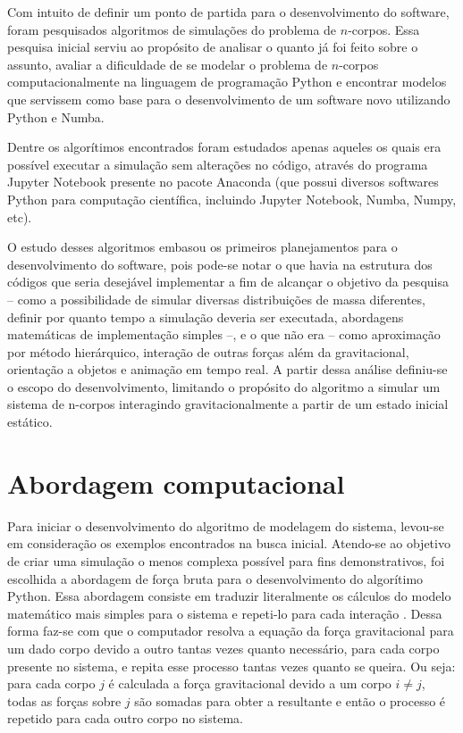 \documentclass[
	12pt,				%
	a4paper,			%
	english,			%
	openright,				%
	brazil,				%
	oneside]{abntex2}
\begin{document}
	Com intuito de definir um ponto de partida para o desenvolvimento do software, foram pesquisados algoritmos de simulações do problema de $n$-corpos. Essa pesquisa inicial serviu ao propósito de analisar o quanto já foi feito sobre o assunto, avaliar a dificuldade de se modelar o problema de $n$-corpos computacionalmente na linguagem de programação Python e encontrar modelos que servissem como base para o desenvolvimento de um software novo utilizando Python e Numba.
	
	Dentre os algorítimos encontrados foram estudados apenas aqueles os quais era possível executar a simulação sem alterações no código, através do programa Jupyter Notebook presente no pacote Anaconda (que possui diversos softwares Python para computação científica, incluindo Jupyter Notebook, Numba, Numpy, etc).
	
	O estudo desses algoritmos embasou os primeiros planejamentos para o desenvolvimento do software, pois pode-se notar o que havia na estrutura dos códigos que seria desejável implementar a fim de alcançar o objetivo da pesquisa -- como a possibilidade de simular diversas distribuições de massa diferentes, definir por quanto tempo a simulação deveria ser executada, abordagens matemáticas de implementação simples --, e o que não era -- como aproximação por método hierárquico, interação de outras forças além da gravitacional, orientação a objetos e animação em tempo real. A partir dessa análise definiu-se o escopo do desenvolvimento, limitando o propósito do algoritmo a simular um sistema de n-corpos interagindo gravitacionalmente a partir de um estado inicial estático.
	
	
\section{Abordagem computacional}

	Para iniciar o desenvolvimento do algoritmo de modelagem do sistema, levou-se em consideração os exemplos encontrados na busca inicial. Atendo-se ao objetivo de criar uma simulação o menos complexa possível para fins demonstrativos, foi escolhida a abordagem de força bruta para o desenvolvimento do algorítimo Python. Essa abordagem consiste em traduzir literalmente os cálculos do modelo matemático mais simples para o sistema e repeti-lo para cada interação \cite{nyland}. Dessa forma faz-se com que o computador resolva a equação da força gravitacional para um dado corpo devido a outro tantas vezes quanto necessário, para cada corpo presente no sistema, e repita esse processo tantas vezes quanto se queira. Ou seja: para cada corpo $j$ é calculada a força gravitacional devido a um corpo $i \neq j$, todas as forças sobre $j$ são somadas para obter a resultante e então o processo é repetido para cada outro corpo no sistema.
	
\end{document}
